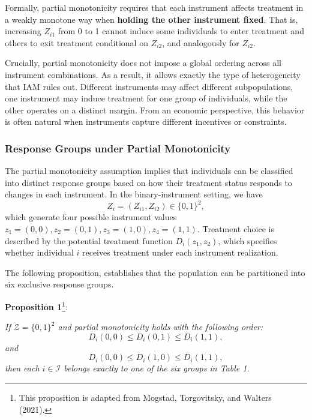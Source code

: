 \documentclass[
  12pt,
  a4paper,
  oneside]{article}
\begin{document}
Formally, partial monotonicity requires that each instrument affects
treatment in a weakly monotone way when
\textbf{holding the other instrument fixed}. That is, increasing
\(Z_{i1}\) from 0 to 1 cannot induce some individuals to enter treatment
and others to exit treatment conditional on \(Z_{i2}\), and analogously
for \(Z_{i2}\).

Crucially, partial monotonicity does not impose a global ordering across
all instrument combinations. As a result, it allows exactly the type of
heterogeneity that IAM rules out. Different instruments may affect
different subpopulations, one instrument may induce treatment for one
group of individuals, while the other operates on a distinct margin.
From an economic perspective, this behavior is often natural when
instruments capture different incentives or constraints.

\subsubsection{Response Groups under Partial
Monotonicity}\label{response-groups-under-partial-monotonicity}

The partial monotonicity assumption implies that individuals can be
classified into distinct response groups based on how their treatment
status responds to changes in each instrument. In the binary-instrument
setting, we have \begin{equation}
Z_i = (Z_{i1}, Z_{i2}) \in \{0,1\}^2,
\end{equation} which generate four possible instrument values
\(z_1 = (0,0), z_2 = (0,1), z_3 = (1,0), z_4 = (1,1)\). Treatment choice
is described by the potential treatment function \(D_i(z_1,z_2)\), which
specifies whether individual \(i\) receives treatment under each
instrument realization.

The following proposition, establishes that the population can be
partitioned into six exclusive response groups.

\textbf{Proposition 1}\footnote{This proposition is adapted from
  Mogstad, Torgovitsky, and Walters (2021).}:

\textit{If $\mathcal{Z} = \{0,1\}^2$ and partial monotonicity holds with the following order:}
\begin{equation}
D_i(0,0) \le D_i(0,1) \le D_i(1,1),
\end{equation} \textit{and} \begin{equation}
D_i(0,0) \le D_i(1,0) \le D_i(1,1),
\end{equation}
\textit{then each $i \in \mathcal{I}$ belongs exactly to one of the six groups in Table 1.}
\end{document}
